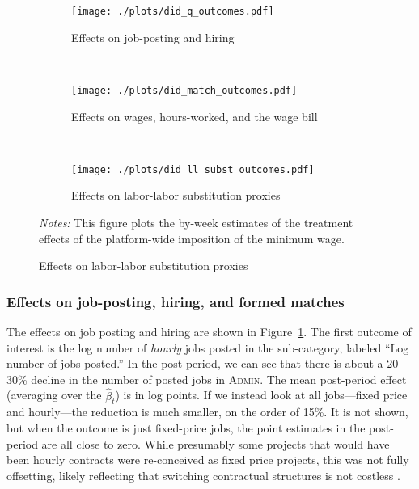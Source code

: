 \documentclass[AER]{AEA}
\newcommand{\admin}{\textsc{Admin}}
\begin{document}
\begin{figure}[h!]
  \centering
  \caption{Difference-in-differences estimates of effects of platform-wide imposition} \label{fig:did_all_outcomes} 
  \begin{minipage}{\linewidth}
    \begin{subfigure}{1 \textwidth}
      \centering
      \caption{Effects on job-posting and hiring} \label{fig:q_outcomes}
      \texttt{[image: ./plots/did\_q\_outcomes.pdf]} 
    \end{subfigure} \\
    \begin{subfigure}{1 \textwidth}
      \caption{Effects on wages, hours-worked, and the wage bill} \label{fig:match_outcomes}
      \texttt{[image: ./plots/did\_match\_outcomes.pdf]} 
    \end{subfigure}\\
    \begin{subfigure}{1 \textwidth}
          \caption{Effects on labor-labor substitution proxies} \label{fig:ll_subst_outcomes}
          \texttt{[image: ./plots/did\_ll\_subst\_outcomes.pdf]}
    \end{subfigure} 
{\footnotesize
  \emph{Notes:} This figure plots the by-week estimates of the treatment effects of the platform-wide imposition of the minimum wage.}
\end{minipage} 
\end{figure} 

\subsubsection{Effects on job-posting, hiring, and formed matches}
The effects on job posting and hiring are shown in Figure~\ref{fig:q_outcomes}. 
The first outcome of interest is the log number of \emph{hourly} jobs posted in the sub-category, labeled ``Log number of jobs posted.''
In the post period, we can see that there is about a 20-30\% decline in the number of posted jobs in \admin{}.
The mean post-period effect (averaging over the $\hat{\beta}_t$) is \DIDnumjobs{} in log points.
If we instead look at all jobs---fixed price and hourly---the reduction is much smaller, on the order of 15\%.
It is not shown, but when the outcome is just fixed-price jobs, the point estimates in the post-period are all close to zero.
While presumably some projects that would have been hourly contracts were re-conceived as fixed price projects, this was not fully offsetting, likely reflecting that switching contractual structures is not costless \citep{bajari2001incentives}.
\end{document}
